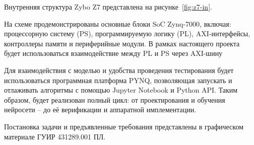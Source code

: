 
Внутренняя структура Zybo Z7 представлена на рисунке~\ref{fig:z7-in}.


На схеме продемонстрированы основные блоки SoC Zynq-7000, включая: процессорную 
систему (PS), программируемую логику (PL), AXI-интерфейсы, контроллеры памяти и 
периферийные модули. В рамках настоящего проекта будет использоваться 
взаимодействие между PL и PS через AXI-шину

Для взаимодействия с моделью и удобства проведения тестирования будет 
использоваться программная платформа PYNQ, позволяющая запускать и отлаживать 
алгоритмы с помощью Jupyter Notebook и Python API. Таким образом, будет 
реализован полный цикл: от проектирования и обучения нейросети – до её 
верификации и аппаратной имплементации.

Постановка задачи и предъявленные требования представлены в графическом 
материале ГУИР 431289.001 ПЛ.
